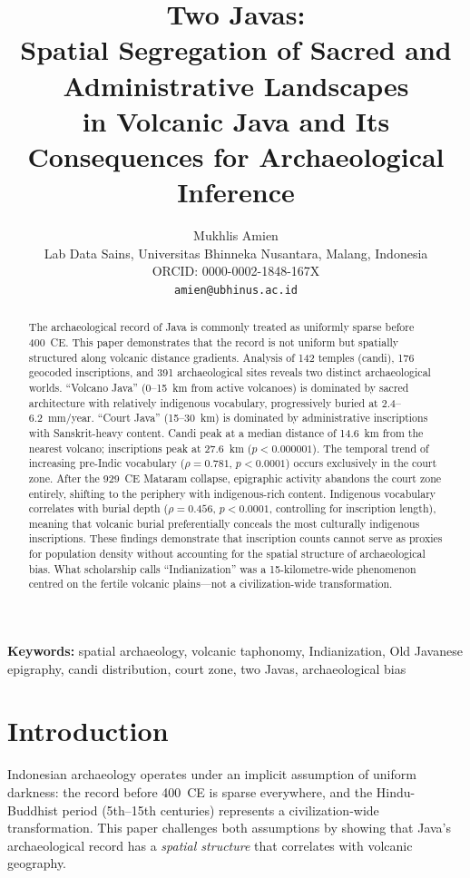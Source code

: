 \documentclass[12pt]{article}
\title{Two Javas:\\Spatial Segregation of Sacred and Administrative Landscapes\\in Volcanic Java and Its Consequences for Archaeological Inference}
\author{Mukhlis Amien\\
\small Lab Data Sains, Universitas Bhinneka Nusantara, Malang, Indonesia\\
\small ORCID: 0000-0002-1848-167X\\
\small \texttt{amien@ubhinus.ac.id}}
\date{}
\begin{document}
\maketitle

\begin{abstract}
The archaeological record of Java is commonly treated as uniformly sparse before 400~CE.
This paper demonstrates that the record is not uniform but spatially structured along volcanic distance gradients.
Analysis of 142 temples (candi), 176 geocoded inscriptions, and 391 archaeological sites reveals two distinct archaeological worlds.
``Volcano Java'' (0--15~km from active volcanoes) is dominated by sacred architecture with relatively indigenous vocabulary, progressively buried at 2.4--6.2~mm/year.
``Court Java'' (15--30~km) is dominated by administrative inscriptions with Sanskrit-heavy content.
Candi peak at a median distance of 14.6~km from the nearest volcano; inscriptions peak at 27.6~km ($p < 0.000001$).
The temporal trend of increasing pre-Indic vocabulary ($\rho = 0.781$, $p < 0.0001$) occurs exclusively in the court zone.
After the 929~CE Mataram collapse, epigraphic activity abandons the court zone entirely, shifting to the periphery with indigenous-rich content.
Indigenous vocabulary correlates with burial depth ($\rho = 0.456$, $p < 0.0001$, controlling for inscription length), meaning that volcanic burial preferentially conceals the most culturally indigenous inscriptions.
These findings demonstrate that inscription counts cannot serve as proxies for population density without accounting for the spatial structure of archaeological bias.
What scholarship calls ``Indianization'' was a 15-kilometre-wide phenomenon centred on the fertile volcanic plains---not a civilization-wide transformation.
\end{abstract}

\noindent\textbf{Keywords:} spatial archaeology, volcanic taphonomy, Indianization, Old Javanese epigraphy, candi distribution, court zone, two Javas, archaeological bias


\section{Introduction}

Indonesian archaeology operates under an implicit assumption of uniform darkness: the record before 400~CE is sparse everywhere, and the Hindu-Buddhist period (5th--15th centuries) represents a civilization-wide transformation.
This paper challenges both assumptions by showing that Java's archaeological record has a \emph{spatial structure} that correlates with volcanic geography.
\end{document}
